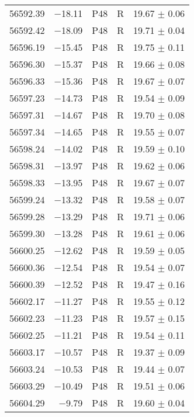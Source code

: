 \begin{tabular}{crccc}
    56592.39  &$-$18.11  &       P48  &   R  &     19.67 $\pm$ 0.06 \\
    56592.42  &$-$18.09  &       P48  &   R  &     19.71 $\pm$ 0.04 \\
    56596.19  &$-$15.45  &       P48  &   R  &     19.75 $\pm$ 0.11 \\
    56596.30  &$-$15.37  &       P48  &   R  &     19.66 $\pm$ 0.08 \\
    56596.33  &$-$15.36  &       P48  &   R  &     19.67 $\pm$ 0.07 \\
    56597.23  &$-$14.73  &       P48  &   R  &     19.54 $\pm$ 0.09 \\
    56597.31  &$-$14.67  &       P48  &   R  &     19.70 $\pm$ 0.08 \\
    56597.34  &$-$14.65  &       P48  &   R  &     19.55 $\pm$ 0.07 \\
    56598.24  &$-$14.02  &       P48  &   R  &     19.59 $\pm$ 0.10 \\
    56598.31  &$-$13.97  &       P48  &   R  &     19.62 $\pm$ 0.06 \\
    56598.33  &$-$13.95  &       P48  &   R  &     19.67 $\pm$ 0.07 \\
    56599.24  &$-$13.32  &       P48  &   R  &     19.58 $\pm$ 0.07 \\
    56599.28  &$-$13.29  &       P48  &   R  &     19.71 $\pm$ 0.06 \\
    56599.30  &$-$13.28  &       P48  &   R  &     19.61 $\pm$ 0.06 \\
    56600.25  &$-$12.62  &       P48  &   R  &     19.59 $\pm$ 0.05 \\
    56600.36  &$-$12.54  &       P48  &   R  &     19.54 $\pm$ 0.07 \\
    56600.39  &$-$12.52  &       P48  &   R  &     19.47 $\pm$ 0.16 \\
    56602.17  &$-$11.27  &       P48  &   R  &     19.55 $\pm$ 0.12 \\
    56602.23  &$-$11.23  &       P48  &   R  &     19.57 $\pm$ 0.15 \\
    56602.25  &$-$11.21  &       P48  &   R  &     19.54 $\pm$ 0.11 \\
    56603.17  &$-$10.57  &       P48  &   R  &     19.37 $\pm$ 0.09 \\
    56603.24  &$-$10.53  &       P48  &   R  &     19.44 $\pm$ 0.07 \\
    56603.29  &$-$10.49  &       P48  &   R  &     19.51 $\pm$ 0.06 \\
    56604.29  & $-$9.79  &       P48  &   R  &     19.60 $\pm$ 0.04 \\

\end{tabular}
